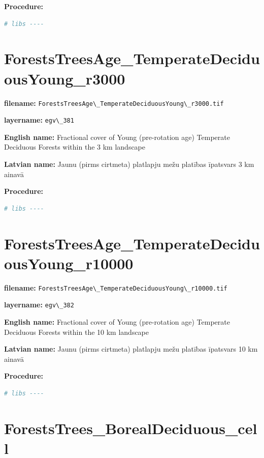 \documentclass[
]{book}
\newcommand{\passthrough}[1]{#1}
\begin{document}
\textbf{Procedure:}

\begin{lstlisting}[language=R]
# libs ----
\end{lstlisting}

\section{ForestsTreesAge\_TemperateDeciduousYoung\_r3000}\label{ch06.381}

\textbf{filename:} \passthrough{\lstinline!ForestsTreesAge\_TemperateDeciduousYoung\_r3000.tif!}

\textbf{layername:} \passthrough{\lstinline!egv\_381!}

\textbf{English name:} Fractional cover of Young (pre-rotation age) Temperate Deciduous Forests within the 3 km landscape

\textbf{Latvian name:} Jaunu (pirms cirtmeta) platlapju mežu platības īpatsvars 3 km ainavā

\textbf{Procedure:}

\begin{lstlisting}[language=R]
# libs ----
\end{lstlisting}

\section{ForestsTreesAge\_TemperateDeciduousYoung\_r10000}\label{ch06.382}

\textbf{filename:} \passthrough{\lstinline!ForestsTreesAge\_TemperateDeciduousYoung\_r10000.tif!}

\textbf{layername:} \passthrough{\lstinline!egv\_382!}

\textbf{English name:} Fractional cover of Young (pre-rotation age) Temperate Deciduous Forests within the 10 km landscape

\textbf{Latvian name:} Jaunu (pirms cirtmeta) platlapju mežu platības īpatsvars 10 km ainavā

\textbf{Procedure:}

\begin{lstlisting}[language=R]
# libs ----
\end{lstlisting}

\section{ForestsTrees\_BorealDeciduous\_cell}\label{ch06.383}
\end{document}
